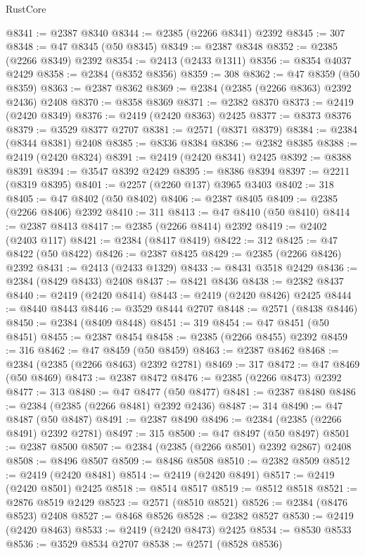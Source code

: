 \begin{lexlean}{RustCore}
\begin{coremodule}
@8341 := @2387 @8340
@8344 := @2385 (@2266 @8341) @2392
@8345 := 307
@8348 := @47 @8345 (@50 @8345)
@8349 := @2387 @8348
@8352 := @2385 (@2266 @8349) @2392
@8354 := @2413 (@2433 @1311)
@8356 := @8354 @4037 @2429
@8358 := @2384 (@8352 @8356)
@8359 := 308
@8362 := @47 @8359 (@50 @8359)
@8363 := @2387 @8362
@8369 := @2384 (@2385 (@2266 @8363) @2392 @2436) @2408
@8370 := @8358 @8369
@8371 := @2382 @8370
@8373 := @2419 (@2420 @8349)
@8376 := @2419 (@2420 @8363) @2425
@8377 := @8373 @8376
@8379 := @3529 @8377 @2707
@8381 := @2571 (@8371 @8379)
@8384 := @2384 (@8344 @8381) @2408
@8385 := @8336 @8384
@8386 := @2382 @8385
@8388 := @2419 (@2420 @8324)
@8391 := @2419 (@2420 @8341) @2425
@8392 := @8388 @8391
@8394 := @3547 @8392 @2429
@8395 := @8386 @8394
@8397 := @2211 (@8319 @8395)
@8401 := @2257 (@2260 @137) @3965 @3403
@8402 := 318
@8405 := @47 @8402 (@50 @8402)
@8406 := @2387 @8405
@8409 := @2385 (@2266 @8406) @2392
@8410 := 311
@8413 := @47 @8410 (@50 @8410)
@8414 := @2387 @8413
@8417 := @2385 (@2266 @8414) @2392
@8419 := @2402 (@2403 @117)
@8421 := @2384 (@8417 @8419)
@8422 := 312
@8425 := @47 @8422 (@50 @8422)
@8426 := @2387 @8425
@8429 := @2385 (@2266 @8426) @2392
@8431 := @2413 (@2433 @1329)
@8433 := @8431 @3518 @2429
@8436 := @2384 (@8429 @8433) @2408
@8437 := @8421 @8436
@8438 := @2382 @8437
@8440 := @2419 (@2420 @8414)
@8443 := @2419 (@2420 @8426) @2425
@8444 := @8440 @8443
@8446 := @3529 @8444 @2707
@8448 := @2571 (@8438 @8446)
@8450 := @2384 (@8409 @8448)
@8451 := 319
@8454 := @47 @8451 (@50 @8451)
@8455 := @2387 @8454
@8458 := @2385 (@2266 @8455) @2392
@8459 := 316
@8462 := @47 @8459 (@50 @8459)
@8463 := @2387 @8462
@8468 := @2384 (@2385 (@2266 @8463) @2392 @2781)
@8469 := 317
@8472 := @47 @8469 (@50 @8469)
@8473 := @2387 @8472
@8476 := @2385 (@2266 @8473) @2392
@8477 := 313
@8480 := @47 @8477 (@50 @8477)
@8481 := @2387 @8480
@8486 := @2384 (@2385 (@2266 @8481) @2392 @2436)
@8487 := 314
@8490 := @47 @8487 (@50 @8487)
@8491 := @2387 @8490
@8496 := @2384 (@2385 (@2266 @8491) @2392 @2781)
@8497 := 315
@8500 := @47 @8497 (@50 @8497)
@8501 := @2387 @8500
@8507 := @2384 (@2385 (@2266 @8501) @2392 @2867) @2408
@8508 := @8496 @8507
@8509 := @8486 @8508
@8510 := @2382 @8509
@8512 := @2419 (@2420 @8481)
@8514 := @2419 (@2420 @8491)
@8517 := @2419 (@2420 @8501) @2425
@8518 := @8514 @8517
@8519 := @8512 @8518
@8521 := @2876 @8519 @2429
@8523 := @2571 (@8510 @8521)
@8526 := @2384 (@8476 @8523) @2408
@8527 := @8468 @8526
@8528 := @2382 @8527
@8530 := @2419 (@2420 @8463)
@8533 := @2419 (@2420 @8473) @2425
@8534 := @8530 @8533
@8536 := @3529 @8534 @2707
@8538 := @2571 (@8528 @8536)

\end{coremodule}
\end{lexlean}

